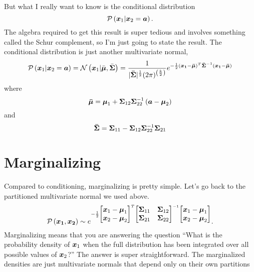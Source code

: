 \documentclass[../../main.tex]{subfiles}
\begin{document}
But what I really want to know is the conditional distribution
\begin{equation}
    \mathcal{P}\left(\boldsymbol{x}_1| \boldsymbol{x}_2=\boldsymbol{a} \right).
\end{equation}
The algebra required to get this result is super tedious and involves
something called the Schur complement, so I'm just going to state the result.
The conditional distribution is just another multivariate normal, 
\begin{equation}
    \mathcal{P}\left(\boldsymbol{x}_1| \boldsymbol{x}_2=\boldsymbol{a} \right) = 
    \mathcal{N}\left(\boldsymbol{x}_1| \bar{\boldsymbol{\mu}}, \bar{\boldsymbol{\Sigma}} \right) = 
        \frac{1}{
                    |\boldsymbol{\bar\Sigma}|^\frac{1}{2} (2\pi)^{\left(\frac{k}{2}\right)}
                }
                e^{
                    -\frac{1}{2}
                    (\boldsymbol{x_1} - \boldsymbol{\bar\mu})^T
                    \boldsymbol{\bar\Sigma}^{-1}
                    (\boldsymbol{x_1} - \boldsymbol{\bar\mu})
            }
\end{equation}
where
\begin{equation}
    \boldsymbol{\bar{\mu}} = \boldsymbol{\mu}_1 + \boldsymbol{\Sigma}_{12}\boldsymbol{\Sigma}_{22}^{-1}
    \left( \boldsymbol{a} - \boldsymbol{\mu}_2 \right)
\end{equation}
and
\begin{equation}
    \boldsymbol{\bar{\Sigma}} =
    \boldsymbol{\Sigma}_{11} - \boldsymbol{\Sigma}_{12}\boldsymbol{\Sigma}_{22}^{-1}\boldsymbol{\Sigma}_{21}
\end{equation}
\section{Marginalizing}
Compared to conditioning, marginalizing is pretty simple.  Let's go back to
the partitioned multivariate normal we used above.
\begin{equation}
    \mathcal{P}\left(\boldsymbol{x_1}, \boldsymbol{x_2} \right)
     \sim e^{
        -\frac{1}{2}
        \begin{bmatrix}
            \boldsymbol{x}_1 - \boldsymbol{\mu}_1 \\
            \boldsymbol{x}_2 - \boldsymbol{\mu}_2
        \end{bmatrix}^T
        \begin{bmatrix}
            \boldsymbol{\Sigma}_{11} & \boldsymbol{\Sigma}_{12} \\ 
            \boldsymbol{\Sigma}_{21} & \boldsymbol{\Sigma}_{22} \\
        \end{bmatrix}^{-1}
        \begin{bmatrix}
            \boldsymbol{x}_1 - \boldsymbol{\mu}_1 \\
            \boldsymbol{x}_2 - \boldsymbol{\mu}_2
        \end{bmatrix}
     }.
\end{equation}
Marginalizing means that you are answering the question ``What is the
probability density of $\boldsymbol{x}_1$ when the full distribution has been
integrated over all possible values of $\boldsymbol{x}_2$?''
The answer is super straightforward.  The marginalized densities are just
multivariate normals that depend only on their own partitions
\end{document}
